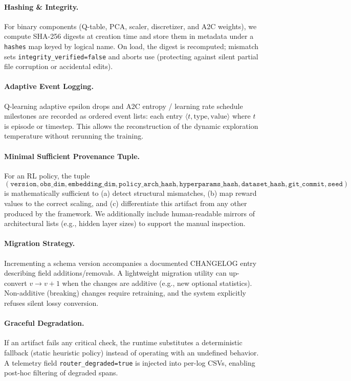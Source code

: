 \paragraph{Hashing \& Integrity.} For binary components (Q-table, PCA, scaler, discretizer, and A2C weights), we compute SHA-256 digests at creation time and store them in metadata under a \texttt{hashes} map keyed by logical name. On load, the digest is recomputed; mismatch sets \texttt{integrity\_verified=false} and aborts use (protecting against silent partial file corruption or accidental edits).

\paragraph{Adaptive Event Logging.} Q-learning adaptive epsilon drops and A2C entropy / learning rate schedule milestones are recorded as ordered event lists: each entry $\langle t, \text{type}, \text{value} \rangle$ where $t$ is episode or timestep. This allows the reconstruction of the dynamic exploration temperature without rerunning the training.

\paragraph{Minimal Sufficient Provenance Tuple.} For an RL policy, the tuple
\[
\left( \texttt{version}, \texttt{obs\_dim}, \texttt{embedding\_dim}, \texttt{policy\_arch\_hash}, \texttt{hyperparams\_hash}, \texttt{dataset\_hash}, \texttt{git\_commit}, \texttt{seed} \right)
\]
is mathematically sufficient to (a) detect structural mismatches, (b) map reward values to the correct scaling, and (c) differentiate this artifact from any other produced by the framework. We additionally include human-readable mirrors of architectural lists (e.g., hidden layer sizes) to support the manual inspection.

\paragraph{Migration Strategy.} Incrementing a schema version accompanies a documented CHANGELOG entry describing field additions/removals. A lightweight migration utility can up-convert $v \rightarrow v+1$ when the changes are additive (e.g., new optional statistics). Non-additive (breaking) changes require retraining, and the system explicitly refuses silent lossy conversion.

\paragraph{Graceful Degradation.} If an artifact fails any critical check, the runtime substitutes a deterministic fallback (static heuristic policy) instead of operating with an undefined behavior. A telemetry field \texttt{router\_degraded=true} is injected into per-log CSVs, enabling post-hoc filtering of degraded spans.

